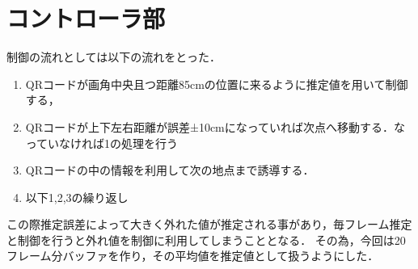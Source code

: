 \section{コントローラ部}
\label{implement_controller}
制御の流れとしては以下の流れをとった．

\begin{enumerate}
    \item QRコードが画角中央且つ距離85cmの位置に来るように推定値を用いて制御する，
    \item QRコードが上下左右距離が誤差±10cmになっていれば次点へ移動する．なっていなければ1の処理を行う
    \item QRコードの中の情報を利用して次の地点まで誘導する．
    \item 以下1,2,3の繰り返し
\end{enumerate}

この際推定誤差によって大きく外れた値が推定される事があり，毎フレーム推定と制御を行うと外れ値を制御に利用してしまうこととなる．
その為，今回は20フレーム分バッファを作り，その平均値を推定値として扱うようにした．

